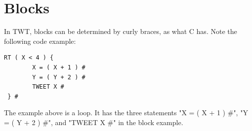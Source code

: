 \documentclass[11pt,a4paper]{report}
\begin{document}
\section{Blocks}

In TWT, blocks can be determined by curly braces, as what C has. Note the
following code example:

\begin{lstlisting}
RT ( X < 4 ) { 
		X = ( X + 1 ) #
		Y = ( Y + 2 ) #
		TWEET X #
 } #
\end{lstlisting}

The example above is a loop. It has the three statements "X = ( X + 1 ) \#", "Y
= ( Y + 2 ) \#", and "TWEET X \#" in the block example.

\section{}
\end{document}
